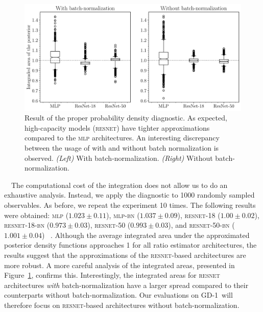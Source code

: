 \documentclass[fleqn,usenatbib]{mnras}
\begin{document}
\medskip

\begin{figure}
    \centering
    \includegraphics[width=\linewidth]{figures/integrand-boxplot-horizontal}
    \caption{Result of the proper probability density diagnostic.
    As expected, high-capacity models (\textsc{resnet}) have tighter approximations compared to the \textsc{mlp} architectures.
    An interesting discrepancy between the usage of with and without batch normalization is observed.
    \emph{(Left)} With batch-normalization.
    \emph{(Right)} Without batch-normalization.
    ~~\protect{}}
    \label{fig:integrand_boxplots}
\end{figure}
~~The computational
cost of the integration does not allow us to do an exhaustive
analysis. Instead, we apply the diagnostic to 1000 randomly
sampled observables. As before, we repeat the experiment 10 times.
The following results were obtained:
\textsc{mlp} ($1.023\pm0.11$),
\textsc{mlp-bn} ($1.037\pm0.09$),
\textsc{resnet-18} ($1.00\pm0.02$),
\textsc{resnet-18-bn} ($0.973\pm0.03$),
\textsc{resnet-50} ($0.993\pm0.03$),
and \textsc{resnet-50-bn} ($1.001\pm0.04$)
~\protect{}.
Although
the average integrated area under the approximated posterior density
functions approaches 1 for all ratio estimator architectures,
the results suggest that the approximations of the
\textsc{resnet}-based architectures are more robust.
A more careful analysis of the integrated areas, presented in Figure~\ref{fig:integrand_boxplots}, confirms this.
Interestingly, the integrated areas for \textsc{resnet} architectures \emph{with} batch-normalization have a larger
spread compared to their counterparts without batch-normalization.
Our evaluations on GD-1~will therefore focus on
\textsc{resnet}-based architectures without batch-normalization.
\end{document}
